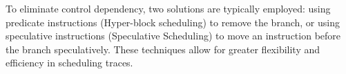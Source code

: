 To eliminate control dependency, two solutions are typically employed: using predicate instructions (Hyper-block scheduling) to remove the branch, or using speculative instructions (Speculative Scheduling) to move an instruction before the branch speculatively. 
These techniques allow for greater flexibility and efficiency in scheduling traces.